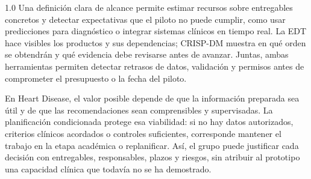 \documentclass[12pt,a4paper]{article}
\begin{document}
\begin{spacing}{1.0}
Una definición clara de alcance permite estimar recursos sobre entregables concretos y detectar expectativas que el piloto no puede cumplir, como usar predicciones para diagnóstico o integrar sistemas clínicos en tiempo real. La EDT hace visibles los productos y sus dependencias; CRISP-DM muestra en qué orden se obtendrán y qué evidencia debe revisarse antes de avanzar. Juntas, ambas herramientas permiten detectar retrasos de datos, validación y permisos antes de comprometer el presupuesto o la fecha del piloto.

En Heart Disease, el valor posible depende de que la información preparada sea útil y de que las recomendaciones sean comprensibles y supervisadas. La planificación condicionada protege esa viabilidad: si no hay datos autorizados, criterios clínicos acordados o controles suficientes, corresponde mantener el trabajo en la etapa académica o replanificar. Así, el grupo puede justificar cada decisión con entregables, responsables, plazos y riesgos, sin atribuir al prototipo una capacidad clínica que todavía no se ha demostrado.
\end{spacing}
\end{document}
